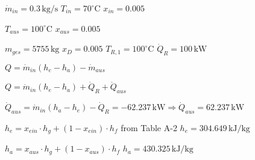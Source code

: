 \( \dot{m}_{in} = 0.3 \, \text{kg/s} \)  
\( T_{in} = 70^\circ \text{C} \)  
\( x_{in} = 0.005 \)  

\( T_{aus} = 100^\circ \text{C} \)  
\( x_{aus} = 0.005 \)  

\( m_{ges} = 5755 \, \text{kg} \)  
\( x_D = 0.005 \)  
\( T_{R,1} = 100^\circ \text{C} \)  
\( \dot{Q}_R = 100 \, \text{kW} \)  

\( Q = \dot{m}_{in} (h_e - h_a) - \dot{m}_{aus} \)  

\( Q = \dot{m}_{in} (h_e - h_a) + \dot{Q}_R + \dot{Q}_{aus} \)  

\( \dot{Q}_{aus} = \dot{m}_{in} (h_a - h_e) - \dot{Q}_R = -62.237 \, \text{kW} \Rightarrow \dot{Q}_{aus} = 62.237 \, \text{kW} \)  

\( h_e = x_{ein} \cdot h_g + (1 - x_{ein}) \cdot h_f \) from Table A-2  
\( h_e = 304.649 \, \text{kJ/kg} \)  

\( h_a = x_{aus} \cdot h_g + (1 - x_{aus}) \cdot h_f \)  
\( h_a = 430.325 \, \text{kJ/kg} \)